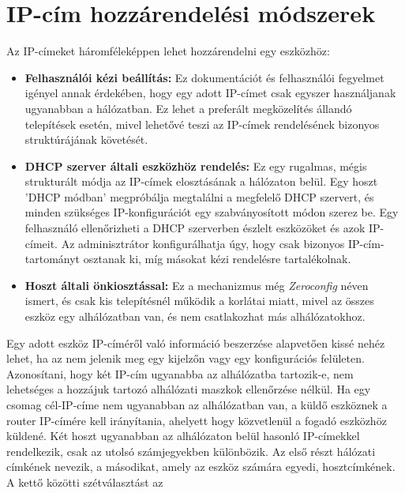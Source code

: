 \section{IP-cím hozzárendelési módszerek}
Az IP-címeket háromféleképpen lehet hozzárendelni egy eszközhöz:
\begin{itemize}
    \item \textbf{Felhasználói kézi beállítás:}
    Ez dokumentációt és felhasználói fegyelmet igényel annak érdekében,
	hogy egy adott IP-címet csak egyszer használjanak ugyanabban a hálózatban.
	Ez lehet a preferált megközelítés állandó telepítések esetén,
	mivel lehetővé teszi az IP-címek rendelésének bizonyos struktúrájának követését.
    
    \item \textbf{DHCP szerver általi eszközhöz rendelés:}
    Ez egy rugalmas, mégis strukturált módja az IP-címek elosztásának a hálózaton belül.
	Egy hoszt 'DHCP módban' megpróbálja megtalálni a megfelelő DHCP szervert,
	és minden szükséges IP-konfigurációt egy szabványosított módon szerez be.
	Egy felhasználó ellenőrizheti a DHCP szerverben észlelt eszközöket és azok IP-címeit.
	Az adminisztrátor konfigurálhatja úgy, hogy csak bizonyos IP-cím-tartományt osztanak ki,
	míg másokat kézi rendelésre tartalékolnak.
    
    \item \textbf{Hoszt általi önkiosztással:}
    Ez a mechanizmus még \textit{Zeroconfig} néven ismert, és csak kis telepítésnél
	működik a korlátai miatt, mivel az összes eszköz egy alhálózatban van,
	és nem csatlakozhat más alhálózatokhoz.
\end{itemize}
Egy adott eszköz IP-címéről való információ beszerzése alapvetően kissé nehéz lehet,
ha az nem jelenik meg egy kijelzőn vagy egy konfigurációs felületen.
Azonosítani, hogy két IP-cím ugyanabba az alhálózatba tartozik-e, nem lehetséges 
a hozzájuk tartozó alhálózati maszkok ellenőrzése nélkül.
Ha egy csomag cél-IP-címe nem ugyanabban az alhálózatban van,
a küldő eszköznek a router IP-címére kell irányítania, ahelyett hogy
közvetlenül a fogadó eszközhöz küldené. 
Két hoszt ugyanabban az alhálózaton belül hasonló IP-címekkel rendelkezik, csak az utolsó számjegyekben
különbözik. Az első részt hálózati címkének nevezik, a másodikat, amely az
eszköz számára egyedi, hosztcímkének. A kettő közötti szétválasztást az
